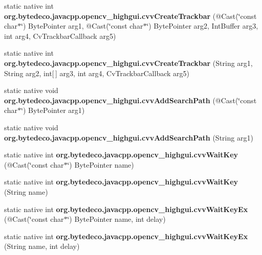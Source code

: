 \begin{DoxyCompactItemize}
\item 
\mbox{\label{group__highgui__c_gad1a87262136c9d9f11bb65c00d66521d}} 
static native int {\bfseries org.\+bytedeco.\+javacpp.\+opencv\+\_\+highgui.\+cvv\+Create\+Trackbar} (@Cast(\char`\"{}const char$\ast$\char`\"{}) Byte\+Pointer arg1, @Cast(\char`\"{}const char$\ast$\char`\"{}) Byte\+Pointer arg2, Int\+Buffer arg3, int arg4, Cv\+Trackbar\+Callback arg5)
\item 
\mbox{\label{group__highgui__c_gaeb4b4c4618f6262e090b6b588e173a51}} 
static native int {\bfseries org.\+bytedeco.\+javacpp.\+opencv\+\_\+highgui.\+cvv\+Create\+Trackbar} (String arg1, String arg2, int\mbox{[}$\,$\mbox{]} arg3, int arg4, Cv\+Trackbar\+Callback arg5)
\item 
\mbox{\label{group__highgui__c_ga91541e2e68071f04c41ced7bf9c2c9b2}} 
static native void {\bfseries org.\+bytedeco.\+javacpp.\+opencv\+\_\+highgui.\+cvv\+Add\+Search\+Path} (@Cast(\char`\"{}const char$\ast$\char`\"{}) Byte\+Pointer arg1)
\item 
\mbox{\label{group__highgui__c_ga0fc51402121a9aefe74981d253acd05d}} 
static native void {\bfseries org.\+bytedeco.\+javacpp.\+opencv\+\_\+highgui.\+cvv\+Add\+Search\+Path} (String arg1)
\item 
\mbox{\label{group__highgui__c_ga8fa02bacc4ae2054a0d91c8b707b9a63}} 
static native int {\bfseries org.\+bytedeco.\+javacpp.\+opencv\+\_\+highgui.\+cvv\+Wait\+Key} (@Cast(\char`\"{}const char$\ast$\char`\"{}) Byte\+Pointer name)
\item 
\mbox{\label{group__highgui__c_gab7d60dd385b4467967a5735177019a0b}} 
static native int {\bfseries org.\+bytedeco.\+javacpp.\+opencv\+\_\+highgui.\+cvv\+Wait\+Key} (String name)
\item 
\mbox{\label{group__highgui__c_ga8dcb9ddfd2fc5861cf7b2ce9cf05d76f}} 
static native int {\bfseries org.\+bytedeco.\+javacpp.\+opencv\+\_\+highgui.\+cvv\+Wait\+Key\+Ex} (@Cast(\char`\"{}const char$\ast$\char`\"{}) Byte\+Pointer name, int delay)
\item 
\mbox{\label{group__highgui__c_gae22763857c766bdf974655d41a625227}} 
static native int {\bfseries org.\+bytedeco.\+javacpp.\+opencv\+\_\+highgui.\+cvv\+Wait\+Key\+Ex} (String name, int delay)
\end{DoxyCompactItemize}
